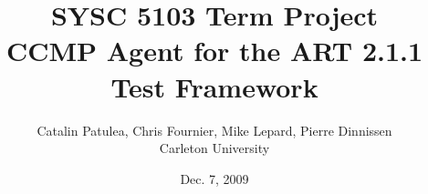 \title{SYSC 5103 Term Project\\CCMP Agent for the ART 2.1.1 Test
Framework}
\date{Dec. 7, 2009}
\author{Catalin Patulea, Chris Fournier, Mike Lepard, Pierre Dinnissen\\Carleton University}
